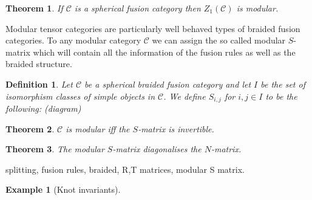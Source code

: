 \documentclass{article}
\newtheorem{definition}{Definition}
\newtheorem{example}{Example}
\newtheorem{theorem}{Theorem}
\begin{document}
\begin{theorem}
	If $\mathcal{C}$ is a spherical fusion category then $Z_1(\mathcal{C})$ is modular.
\end{theorem}
Modular tensor categories are particularly well behaved types of braided fusion categories. To any modular category $\mathcal{C}$ we can assign the so called modular $S$-matrix which will contain all the information of the fusion rules as well as the braided structure.
\begin{definition}
	Let $\mathcal{C}$ be a spherical braided fusion category and let $I$ be the set of isomorphism classes of simple objects in $\mathcal{C}$. We define $S_{i,j}$ for $i,j \in I$ to be the following: (diagram)
\end{definition}
\begin{theorem}
	$\mathcal{C}$ is modular iff the $S$-matrix is invertible.
\end{theorem}
\begin{theorem}
	The modular $S$-matrix diagonalises the $N$-matrix.
\end{theorem}
splitting, fusion rules, braided, R,T matrices, modular S matrix.

\begin{example}[Knot invariants]
\end{example}
\end{document}
